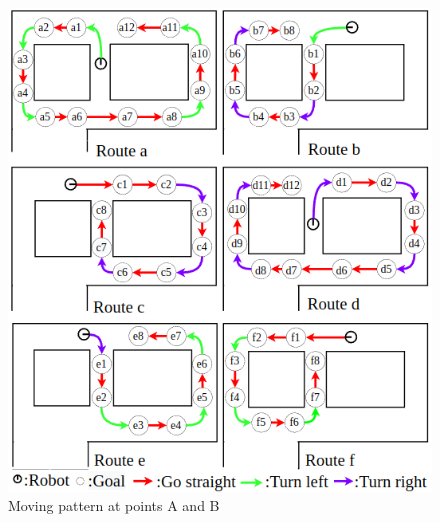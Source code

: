 \vspace{1cm}

\begin{figure}[hbtp]
  \centering
 \includegraphics[keepaspectratio, scale=0.6]
      {images/route.png}
 \caption{Moving pattern at points A and B}
 \label{Fig:route}
\end{figure}

\newpage
